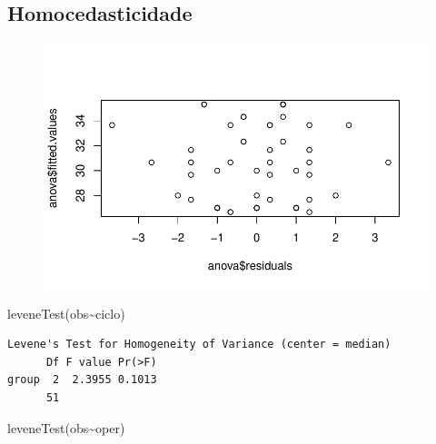 \documentclass[
  letterpaper,
  DIV=11,
  numbers=noendperiod]{scrartcl}
\newenvironment{Shaded}{\begin{snugshade}}{\end{snugshade}}
\newcommand{\FunctionTok}[1]{\textcolor[rgb]{0.28,0.35,0.67}{#1}}
\newcommand{\NormalTok}[1]{\textcolor[rgb]{0.00,0.23,0.31}{#1}}
\newcommand{\SpecialCharTok}[1]{\textcolor[rgb]{0.37,0.37,0.37}{#1}}
\begin{document}
\hypertarget{homocedasticidade}{%
\subsection{Homocedasticidade}\label{homocedasticidade}}

\begin{Shaded}
\end{Shaded}

\begin{figure}[H]

{\centering \includegraphics{fatorial_multi_files/figure-pdf/unnamed-chunk-7-1.pdf}

}

\end{figure}

\begin{Shaded}
\begin{Highlighting}[]
\FunctionTok{leveneTest}\NormalTok{(obs}\SpecialCharTok{\textasciitilde{}}\NormalTok{ciclo)}
\end{Highlighting}
\end{Shaded}

\begin{verbatim}
Levene's Test for Homogeneity of Variance (center = median)
      Df F value Pr(>F)
group  2  2.3955 0.1013
      51               
\end{verbatim}

\begin{Shaded}
\begin{Highlighting}[]
\FunctionTok{leveneTest}\NormalTok{(obs}\SpecialCharTok{\textasciitilde{}}\NormalTok{oper)}
\end{Highlighting}
\end{Shaded}
\end{document}
